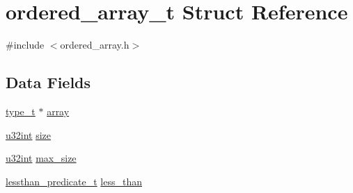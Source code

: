 \hypertarget{structordered__array__t}{
\section{ordered\_\-array\_\-t Struct Reference}
\label{structordered__array__t}
}


{\ttfamily \#include $<$ordered\_\-array.h$>$}

\subsection*{Data Fields}
\begin{DoxyCompactItemize}
\item 
\hyperlink{ordered__array_8h_acece46f31fb63617f4e9798b0dec1694}{type\_\-t} $\ast$ \hyperlink{structordered__array__t_a6035ea45258f7731eff12377d4e95ae2}{array}
\item 
\hyperlink{library_8h_ad7ecf93b77285d9bf039d27fa3f1a588}{u32int} \hyperlink{structordered__array__t_a8c5ccb4d457cb24df33a7c9facfa2650}{size}
\item 
\hyperlink{library_8h_ad7ecf93b77285d9bf039d27fa3f1a588}{u32int} \hyperlink{structordered__array__t_aff98f60fdff673e586a88d147da4798c}{max\_\-size}
\item 
\hyperlink{ordered__array_8h_a23dcdab93c14dfac0f4d51af4109556b}{lessthan\_\-predicate\_\-t} \hyperlink{structordered__array__t_aec29c0ec7f484bdd60b42c7ef04aa25f}{less\_\-than}
\end{DoxyCompactItemize}



